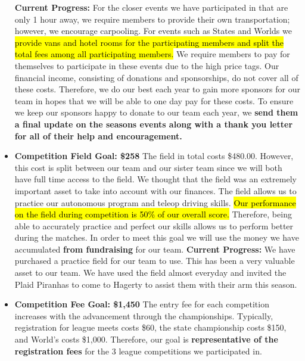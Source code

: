 \begin{itemize}
  \textbf{Current Progress: }
  For the closer events we have participated in that are only 1 hour away, we require members to provide their own transportation; however, we encourage carpooling. For events such as States and Worlds we \hl{provide vans and hotel rooms for the participating members and split the total fees among all participating members.} We require members to pay for themselves to participate in these events due to the high price tags. Our financial income, consisting of donations and sponsorships, do not cover all of these costs. Therefore, we do our best each year to gain more sponsors for our team in hopes that we will be able to one day pay for these costs. To ensure we keep our sponsors happy to donate to our team each year, we \textbf{send them a final update on the seasons events along with a thank you letter for all of their help and encouragement.} 
  \item \textbf{\Large Competition Field Goal: \$258}
  \newline 
   The field in total costs \$480.00. However, this cost is split between our team and our sister team since we will both have full time access to the field. We thought that the field was an extremely important asset to take into account with our finances. The field allows us to practice our autonomous program and teleop driving skills. \hl{Our performance on the field during competition is 50\% of our overall score.} Therefore, being able to accurately practice and perfect our skills allows us to perform better during the matches. In order to meet this goal we will use the money we have accumulated \textbf{from fundraising} for our team.
  \newline 
\textbf{Current Progress:} We have purchased a practice field for our team to use. This has been a very valuable asset to our team. We have used the field almost everyday and invited the Plaid Piranhas to come to Hagerty to assist them with their arm this season.
  \item \textbf{\Large Competition Fee Goal: \$1,450}
  \newline 
  The entry fee for each competition increases with the advancement through the championships. Typically, registration for league meets costs \$60, the state championship costs \$150, and World's costs \$1,000. Therefore, our goal is \textbf{representative of the registration fees} for the 3 league competitions we participated in.
  

\end{itemize}
